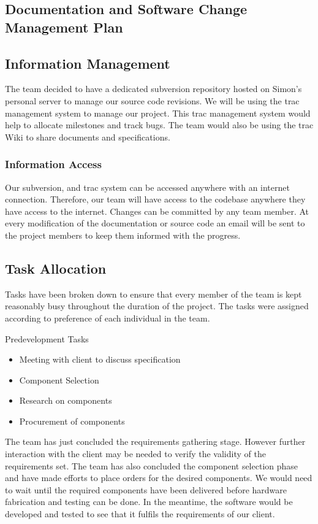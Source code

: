 \documentclass{article}
\begin{document}
\subsection {Documentation and Software Change Management Plan}
\subsection {Information Management}

The team decided to have a dedicated subversion repository hosted on Simon’s personal server to manage our source code revisions. We will be using the trac management system to manage our project. This trac management system would help to allocate milestones and track bugs. The team would also be using the trac Wiki to share documents and specifications.

\subsubsection {Information Access}

Our subversion, and trac system can be accessed anywhere with an internet connection. Therefore, our team will have access to the codebase anywhere they have access to the internet. Changes can be committed by any team member. At every modification of the documentation or source code an email will be sent to the project members to keep them informed with the progress.

\subsection {Task Allocation}
Tasks have been broken down to ensure that every member of the team is kept reasonably busy throughout the duration of the project. The tasks were assigned according to preference of each individual in the team.

Predevelopment Tasks

\begin{itemize}
\item Meeting with client to discuss specification
\item Component Selection
\item Research on components
\item Procurement of components
\end{itemize}

The team has just concluded the requirements gathering stage. However further interaction with the client may be needed to verify the validity of the requirements set. The team has also concluded the component selection phase and have made efforts to place orders for the desired components.
We would need to wait until the required components have been delivered before hardware fabrication and testing can be done. In the meantime, the software would be developed and tested to see that it fulfils the requirements of our client.
	
\end{document}
